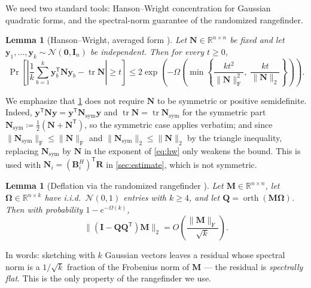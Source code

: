 \documentclass{article}
\renewcommand{\vec}[1]{\mathbf{#1}}          %
\newcommand{\T}{\mathsf{T}}                  %
\newcommand{\F}{\mathrm{F}}                  %
\DeclareMathOperator{\tr}{tr}
\DeclareMathOperator{\orth}{orth}
\newtheorem{lemma}[theorem]{Lemma}
\theoremstyle{remark}
\begin{document}
We need two standard tools: Hanson--Wright concentration for Gaussian quadratic forms, and the spectral-norm guarantee of the randomized rangefinder.

\begin{lemma}[Hanson--Wright, averaged form \cite{Hanson1971,rudelson2013hanson}]\label{lem:hw}
Let $\vec{N} \in \mathbb{R}^{n \times n}$ be fixed and let $\vec{y}_1, \dots, \vec{y}_k \sim \mathcal{N}(\vec 0, \vec{I}_n)$ be independent.
Then for every $t \ge 0$,
\begin{equation}\label{eq:hw}
\Pr\left[ \left| \frac{1}{k}\sum_{b=1}^{k} \vec{y}_b^\T \vec{N} \vec{y}_b - \tr \vec{N} \right| \ge t \right]
\le 2\exp\left( -\Omega\!\left( \min\left\{ \frac{k t^2}{\|\vec{N}\|_\F^2},\; \frac{k t}{\|\vec{N}\|_2} \right\} \right) \right).
\end{equation}
\end{lemma}


We emphasize that \cref{lem:hw} does not require $\vec N$ to be symmetric or positive semidefinite.
Indeed, $\vec{y}^\T\vec{N}\vec{y} = \vec{y}^\T \vec{N}_{\mathrm{sym}} \vec{y}$ and $\tr\vec{N} = \tr\vec{N}_{\mathrm{sym}}$ for the symmetric part $\vec{N}_{\mathrm{sym}} \coloneqq \tfrac12(\vec{N} + \vec{N}^\T)$, so the symmetric case applies verbatim; and since $\|\vec{N}_{\mathrm{sym}}\|_\F \le \|\vec{N}\|_\F$ and $\|\vec{N}_{\mathrm{sym}}\|_2 \le \|\vec{N}\|_2$ by the triangle inequality, replacing $\vec{N}_{\mathrm{sym}}$ by $\vec{N}$ in the exponent of \cref{eq:hw} only weakens the bound.
This is used with $\vec{N}_i = (\vec{B}_i^H)^\T\vec{R}$ in \cref{sec:estimate}, which is not symmetric.

\begin{lemma}[Deflation via the randomized rangefinder \cite{HMT11}]\label{lem:rsvd}
Let $\vec{M} \in \mathbb{R}^{n \times n}$, let $\vec{\Omega} \in \mathbb{R}^{n \times k}$ have i.i.d.\ $\mathcal{N}(0,1)$ entries with $k \ge 4$, and let $\vec{Q} = \orth(\vec{M}\vec{\Omega})$.
Then with probability $1 - e^{-\Omega(k)}$,
\begin{equation}\label{eq:deflation}
\|(\vec{I} - \vec{Q}\vec{Q}^\T)\vec{M}\|_2 = O\!\left( \frac{\|\vec{M}\|_\F}{\sqrt{k}} \right) .
\end{equation}
\end{lemma}

\noindent
In words: sketching with $k$ Gaussian vectors leaves a residual whose spectral norm is a $1/\sqrt k$ fraction of the Frobenius norm of $\vec M$ --- the residual is \emph{spectrally flat}.
This is the only property of the rangefinder we use.
\end{document}
